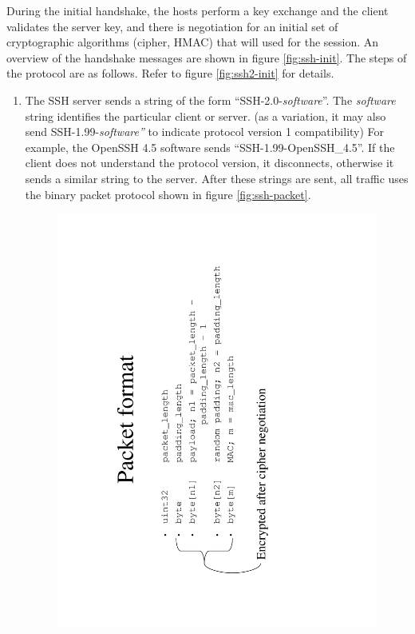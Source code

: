During the initial handshake, the hosts perform a key exchange and
the client validates the server key, and there is negotiation for
an initial set of cryptographic algorithms (cipher, HMAC) that will
used for the session. An overview of the handshake messages are shown
in figure \ref{fig:ssh-init}. The steps of the protocol are as follows.
Refer to figure \ref{fig:ssh2-init} for details.
\begin{enumerate}
\item The SSH server sends a string of the form {}``SSH-2.0-\emph{software}''.
The \emph{software} string identifies the particular client or server.
(as a variation, it may also send SSH-1.99-\emph{software''} to indicate
protocol version 1 compatibility) For example, the OpenSSH 4.5 software
sends {}``SSH-1.99-OpenSSH\_4.5''. If the client does not understand
the protocol version, it disconnects, otherwise it sends a similar
string to the server. After these strings are sent, all traffic uses
the binary packet protocol shown in figure  \ref{fig:ssh-packet}.\\
%
\begin{figure}
\begin{centering}
\includegraphics[clip,scale=0.4,angle=270]{ssh_packet}
\par\end{centering}


\end{figure}
\end{enumerate}
